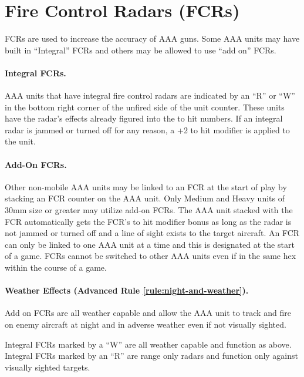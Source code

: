 
\section{Fire Control Radars (FCRs)}

FCRs are used to increase the accuracy of AAA guns. Some AAA units may have built in “Integral” FCRs and others may be allowed to use “add on” FCRs.

\paragraph{Integral FCRs.} AAA units that have integral fire control radars are indicated by an “R” or “W” in the bottom right corner of the unfired side of the unit counter. These units have the radar's effects already figured into the to hit numbers. If an integral radar is jammed or turned off for any reason, a +2 to hit modifier is applied to the unit.

\paragraph{Add-On FCRs.} Other non-mobile AAA units may be linked to an FCR at the start of play by stacking an FCR counter on the AAA unit. Only Medium and Heavy units of 30mm size or greater may utilize add-on FCRs. The AAA unit stacked with the FCR automatically gets the FCR's to hit modifier bonus as long as the radar is not jammed or turned off and a line of sight exists to the target aircraft. An FCR can only be linked to one AAA unit at a time and this is designated at the start of a game. FCRs cannot be switched to other AAA units even if in the same hex within the course of a game.

\paragraph{Weather Effects (Advanced Rule \ref{rule:night-and-weather}).} Add on FCRs are all weather capable and allow the AAA unit to track and fire on enemy aircraft at night and in adverse weather even if not visually sighted.

Integral FCRs marked by a “W” are all weather capable and function as above. Integral FCRs marked by an “R” are range only radars and function only against visually sighted targets.

